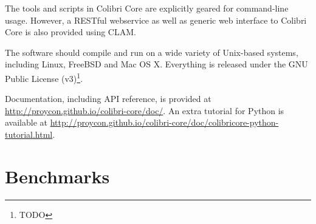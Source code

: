 The tools and scripts in Colibri Core are explicitly geared for command-line
usage. However, a RESTful webservice as well as generic web interface to
Colibri Core is also provided using CLAM\cite{CLAM}.

The software should compile and run on a wide variety of Unix-based systems,
including Linux, FreeBSD and Mac OS X. Everything is released under the GNU
Public License (v3)\footnote{TODO}.

Documentation, including API reference, is provided at
\url{http://proycon.github.io/colibri-core/doc/}. An extra tutorial for Python
is available at
\url{http://proycon.github.io/colibri-core/doc/colibricore-python-tutorial.html}.

\section{Benchmarks}













